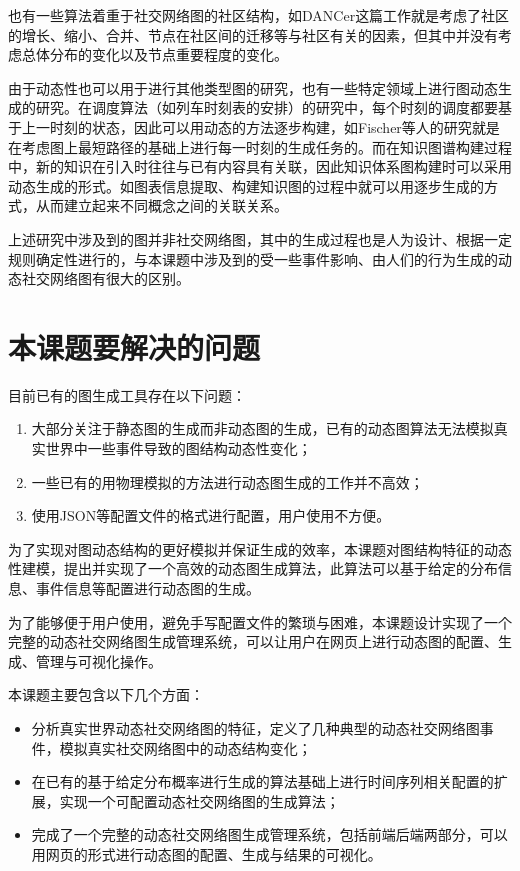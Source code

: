 也有一些算法着重于社交网络图的社区结构，如DANCer\cite{DANCer}这篇工作就是考虑了社区的增长、缩小、合并、节点在社区间的迁移等与社区有关的因素，但其中并没有考虑总体分布的变化以及节点重要程度的变化。

由于动态性也可以用于进行其他类型图的研究，也有一些特定领域上进行图动态生成的研究。在调度算法（如列车时刻表的安排）的研究中，每个时刻的调度都要基于上一时刻的状态，因此可以用动态的方法逐步构建，如Fischer等人的研究\cite{Fischer2011Dynamic}就是在考虑图上最短路径的基础上进行每一时刻的生成任务的。而在知识图谱构建过程中，新的知识在引入时往往与已有内容具有关联，因此知识体系图构建时可以采用动态生成的形式。如图表信息提取、构建知识图的过程中就可以用逐步生成的方式\cite{Kim2017Dynamic}，从而建立起来不同概念之间的关联关系。

上述研究中涉及到的图并非社交网络图，其中的生成过程也是人为设计、根据一定规则确定性进行的，与本课题中涉及到的受一些事件影响、由人们的行为生成的动态社交网络图有很大的区别。

\section{本课题要解决的问题}
\label{content:problem}

目前已有的图生成工具存在以下问题：

\begin{enumerate}
  \item 大部分关注于静态图的生成而非动态图的生成，已有的动态图算法无法模拟真实世界中一些事件导致的图结构动态性变化；
  \item 一些已有的用物理模拟的方法\cite{De2014Dynamic}进行动态图生成的工作并不高效；
  \item 使用JSON等配置文件的格式进行配置\cite{FastSGG}，用户使用不方便。
\end{enumerate}

\vspace{0.2cm}

为了实现对图动态结构的更好模拟并保证生成的效率，本课题对图结构特征的动态性建模，提出并实现了一个高效的动态图生成算法，此算法可以基于给定的分布信息、事件信息等配置进行动态图的生成。

为了能够便于用户使用，避免手写配置文件的繁琐与困难，本课题设计实现了一个完整的动态社交网络图生成管理系统，可以让用户在网页上进行动态图的配置、生成、管理与可视化操作。

本课题主要包含以下几个方面：

\begin{itemize}
  \item 分析真实世界动态社交网络图的特征，定义了几种典型的动态社交网络图事件，模拟真实社交网络图中的动态结构变化；
  \item 在已有的基于给定分布概率进行生成的算法\cite{FastSGG}基础上进行时间序列相关配置的扩展，实现一个可配置动态社交网络图的生成算法；
  \item 完成了一个完整的动态社交网络图生成管理系统，包括前端后端两部分，可以用网页的形式进行动态图的配置、生成与结果的可视化。
\end{itemize}
